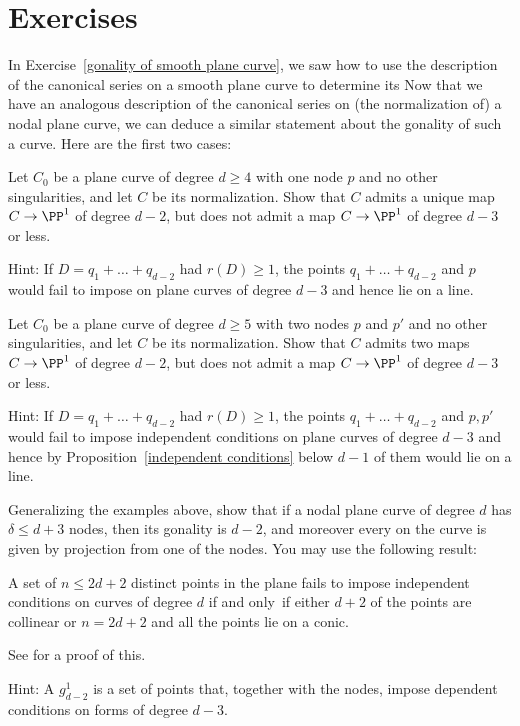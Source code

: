 \section{Exercises}

In Exercise~\ref{gonality of smooth plane curve}, we saw how to use the
description of the canonical series on a smooth plane curve to determine its 
Now that we have an analogous description of the canonical
series on (the normalization of) a nodal plane curve, we can deduce a
similar statement about the gonality of such a curve. Here are the first
two cases:

\begin{exercise}
Let $C_0$ be a plane curve of degree $d\geq 4$ with one node $p$ and no
other singularities, and let $C$ be its normalization. Show that $C$
admits a unique map $C \to \PP^1$ of degree $d-2$, but does not admit
a map $C \to \PP^1$ of degree $d-3$ or less.

Hint: If $D = q_1 + \dots + q_{d-2}$ had $r(D) \geq 1$, the points $q_1 +
\dots + q_{d-2}$ and $p$ would fail to impose 
on
%
plane curves of degree $d-3$ and hence lie on a line.
\end{exercise}

\begin{exercise}
Let $C_0$ be a plane curve of degree $d\geq 5$ with two nodes $p$ and $p'$
and no other singularities, and let $C$ be its normalization. Show that
%
$C$ admits two maps $C \to \PP^1$ of degree $d-2$, but does not admit
a map $C \to \PP^1$ of degree $d-3$ or less.

Hint: If $D = q_1 + \dots + q_{d-2}$ had $r(D) \geq 1$, the points $q_1 +
\dots + q_{d-2}$ and $p, p'$ would fail to impose independent conditions
on plane curves of degree $d-3$ and hence by Proposition~\ref{independent
conditions} below $d-1$ of them would lie on a line.
\end{exercise}

\begin{exercise}
Generalizing the examples above, show that if a nodal plane curve of
degree $d$ has $\delta\leq d+3$ nodes,
then its gonality is $d-2$, and moreover every 
on the curve is
given by projection from one of the nodes.
You may use the following result:
\begin{proposition}\label{independent conditions}
 A set of $n \leq 2d+ 2$ distinct
points in the plane fails to impose independent conditions on curves
of degree
$d$ if and only~if either $d + 2$ of the points  are collinear or $n =
2d + 2$ and all the points lie
on a conic.
\end{proposition}
See \cite[p.~302]{MR1376653} for a proof of this.

Hint: A $g^1_{d-2}$ is a set of points that, together with the nodes,
impose dependent conditions on forms of degree $d-3$.
\end{exercise}

